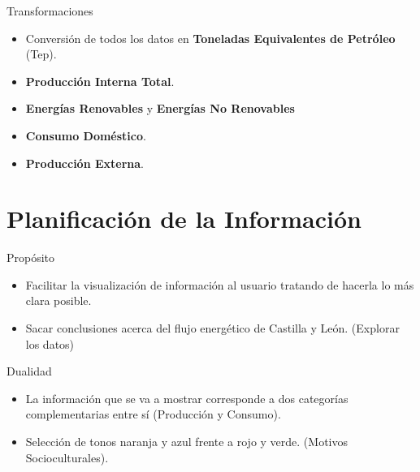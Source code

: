 \documentclass{beamer}
\begin{document}
		\begin{frame}{Transformaciones}
		
			\begin{itemize}

				\item Conversión de todos los datos en {\bf Toneladas Equivalentes de Petróleo} (Tep).
				
				\item {\bf Producción Interna Total}.
				
				\item {\bf Energías Renovables} y {\bf Energías No Renovables}
				
				\item {\bf Consumo Doméstico}.
				
				\item {\bf Producción Externa}.
				
			\end{itemize}

		\end{frame}
		
	\section{Planificación de la Información}

		\begin{frame}{Propósito}
		
			\begin{itemize}
				\item Facilitar la visualización de información al usuario tratando de hacerla lo más clara posible.
			
				\item Sacar conclusiones acerca del flujo energético de Castilla y León. (Explorar los datos)
			
			\end{itemize}
		
		\end{frame}
		
		\begin{frame}{Dualidad}
		
			\begin{itemize}
				\item La información que se va a mostrar corresponde a dos categorías complementarias entre sí (Producción y Consumo).
							
				\item Selección de tonos naranja y azul frente a rojo y verde. (Motivos Socioculturales).
			
			\end{itemize}
		
		\end{frame}
\end{document}
